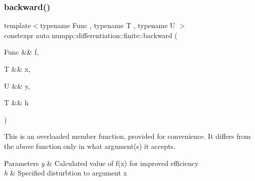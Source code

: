 \subsubsection{\texorpdfstring{backward()}{backward()}\hspace{0.1cm}{\footnotesize\ttfamily [3/3]}}
{\footnotesize\ttfamily template$<$typename Func , typename T , typename U $>$ \\
constexpr auto numpp\+::differentiation\+::finite\+::backward (\begin{DoxyParamCaption}\item[{Func \&\&}]{f,  }\item[{T \&\&}]{x,  }\item[{U \&\&}]{y,  }\item[{T \&\&}]{h }\end{DoxyParamCaption})}

This is an overloaded member function, provided for convenience. It differs from the above function only in what argument(s) it accepts.


\begin{DoxyParams}{Parameters}
{\em y} & Calculated value of f(x) for improved efficiency \\
\hline
{\em h} & Specified disturbtion to argument x\\
\hline
\end{DoxyParams}
